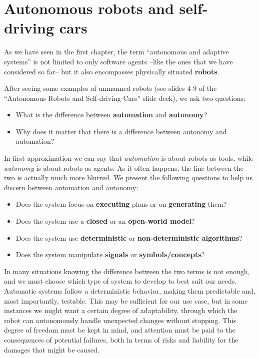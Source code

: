 \chapter{Autonomous robots and self-driving cars}
As we have seen in the first chapter, the term ``autonomous and adaptive systems'' is not limited to only software agents --like the ones that we have considered so far-- but it also encompasses physically situated \textbf{robots}.

After seeing some examples of unmanned robots (see slides 4-9 of the ``Autonomous Robots and Self-driving Cars'' slide deck), we ask two questions:

\begin{itemize}
    \item What is the difference between \textbf{automation} and \textbf{autonomy}?
    \item Why does it matter that there is a difference between autonomy and automation?
\end{itemize}

In first approximation we can say that \textit{automation} is about robots as tools, while \textit{autonomy} is about robots as agents. As it often happens, the line between the two is actually much more blurred. We present the following questions to help us discern between automation and autonomy:

\begin{itemize}
    \item Does the system focus on \textbf{executing} plans or on \textbf{generating} them?
    \item Does the system use a \textbf{closed} or an \textbf{open-world model}?
    \item Does the system use \textbf{deterministic} or \textbf{non-deterministic algorithms}?
    \item Does the system manipulate \textbf{signals} or \textbf{symbols/concepts}?
\end{itemize}

In many situations knowing the difference between the two terms is not enough, and we must choose which type of system to develop to best suit our needs. Automatic systems follow a deterministic behavior, making them predictable and, most importantly, testable. This may be sufficient for our use case, but in some instances we might want a certain degree of adaptability, through which the robot can autonomously handle unexpected changes without stopping. This degree of freedom must be kept in mind, and attention must be paid to the consequences of potential failures, both in terms of risks and liability for the damages that might be caused.

